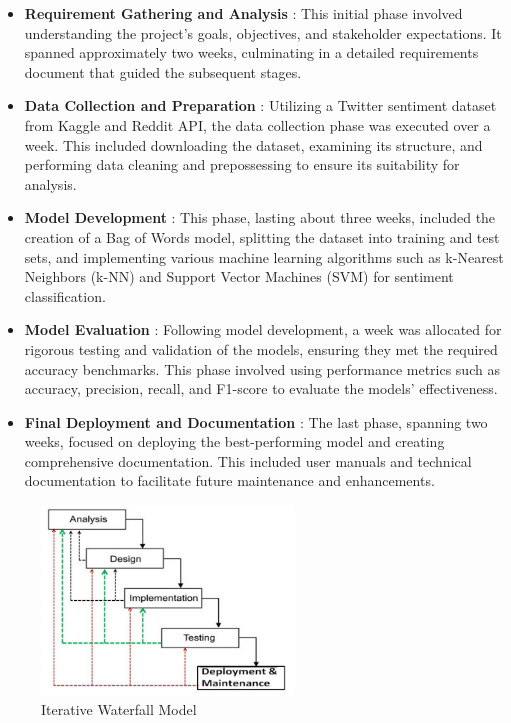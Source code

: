 \begin{itemize}
    \item \textbf{Requirement Gathering and Analysis} :
    \noindent
    This initial phase involved understanding the project's goals, objectives, and stakeholder expectations. It spanned approximately two weeks, culminating in a detailed requirements document that guided the subsequent stages.
    \item \textbf{Data Collection and Preparation} :
    \noindent
    Utilizing a Twitter sentiment dataset from Kaggle and Reddit API, the data collection phase was executed over a week. This included downloading the dataset, examining its structure, and performing data cleaning and prepossessing to ensure its suitability for analysis.
    \item \textbf{Model Development} :
    \noindent
    This phase, lasting about three weeks, included the creation of a Bag of Words model, splitting the dataset into training and test sets, and implementing various machine learning algorithms such as k-Nearest Neighbors (k-NN) and Support Vector Machines (SVM) for sentiment classification.
    \item \textbf{Model Evaluation} :
    \noindent
    Following model development, a week was allocated for rigorous testing and validation of the models, ensuring they met the required accuracy benchmarks. This phase involved using performance metrics such as accuracy, precision, recall, and F1-score to evaluate the models' effectiveness.
    \item \textbf{Final Deployment and Documentation} :
    \noindent
    The last phase, spanning two weeks, focused on deploying the best-performing model and creating comprehensive documentation. This included user manuals and technical documentation to facilitate future maintenance and enhancements.
\end{itemize}

\begin{figure}[h!]  
    \centering
    \includegraphics[width=0.6\textwidth]{Images/01 Life_cycle.jpg}  
    \caption{Iterative Waterfall Model}
    \label{Iterative Waterfall Model}  %
\end{figure}


